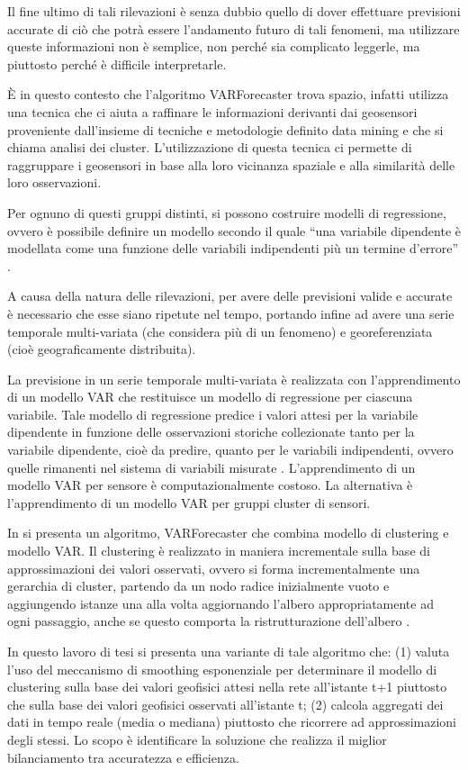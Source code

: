 \documentclass[12pt,a4paper,twoside,openright]{book}
\begin{document}
Il fine ultimo di tali rilevazioni è senza dubbio quello di dover effettuare previsioni accurate di ciò che potrà essere l’andamento futuro di tali fenomeni, ma utilizzare queste informazioni non è semplice, non perché sia complicato leggerle, ma piuttosto perché è difficile interpretarle. 


È in questo contesto che l’algoritmo VARForecaster trova spazio, infatti utilizza una tecnica che ci aiuta a raffinare le informazioni derivanti dai geosensori proveniente dall’insieme di tecniche e metodologie definito data mining e che si chiama analisi dei cluster. L’utilizzazione di questa tecnica ci permette di raggruppare i geosensori in base alla loro vicinanza spaziale e alla similarità delle loro osservazioni.

Per ognuno di questi gruppi distinti, si possono costruire modelli di regressione, ovvero è possibile definire un modello secondo il quale “una variabile dipendente è modellata come una funzione delle variabili indipendenti più un termine d'errore” \cite{2a}.

A causa della natura delle rilevazioni, per avere delle previsioni valide e accurate è necessario che esse siano ripetute nel tempo, portando infine ad avere una serie temporale multi-variata (che considera più di un fenomeno) e georeferenziata (cioè geograficamente distribuita).


La previsione in un serie temporale multi-variata è realizzata con l'apprendimento di un modello VAR che restituisce un modello di regressione per ciascuna variabile. Tale modello di regressione predice i valori attesi per la variabile dipendente in funzione delle osservazioni storiche collezionate tanto per la variabile dipendente, cioè da predire, quanto per le variabili indipendenti, ovvero quelle rimanenti nel sistema di variabili misurate \cite{3a}. L'apprendimento di un modello VAR per sensore è computazionalmente costoso. La alternativa è l'apprendimento di un modello VAR per gruppi cluster di sensori.


In \cite{donato} si presenta un algoritmo, VARForecaster che combina modello di clustering e modello VAR. Il clustering è realizzato in maniera incrementale sulla base di approssimazioni dei valori osservati, ovvero si forma incrementalmente una gerarchia di cluster, partendo da un nodo radice inizialmente vuoto e aggiungendo istanze una alla volta aggiornando l’albero appropriatamente ad ogni passaggio, anche se questo comporta la ristrutturazione dell’albero \cite{4a}.

In questo lavoro di tesi si presenta una variante di tale algoritmo che: (1) valuta l'uso del meccanismo di smoothing esponenziale per determinare il modello di clustering sulla base dei valori geofisici attesi nella rete all'istante t+1 piuttosto che sulla base dei valori geofisici osservati all'istante t; (2) calcola aggregati dei dati in tempo reale (media o mediana) piuttosto che ricorrere ad approssimazioni degli stessi. Lo scopo è identificare la soluzione che realizza il miglior bilanciamento tra accuratezza e efficienza.
\newpage
\end{document}
